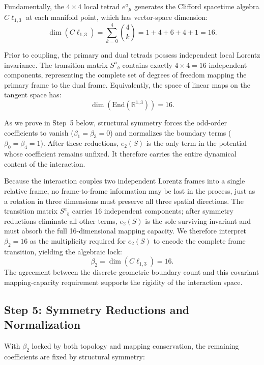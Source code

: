 \documentclass[twocolumn]{iopjournal}
\begin{document}
Fundamentally, the $4 \times 4$ local tetrad $e^a{}_\mu$ generates the Clifford spacetime algebra $C\ell_{1,3}$ at each manifold point, which has vector-space dimension:
\begin{equation}
\dim(C\ell_{1,3}) = \sum_{k=0}^{4} \binom{4}{k} = 1 + 4 + 6 + 4 + 1 = 16.
\end{equation}


Prior to coupling, the primary and dual tetrads possess independent local Lorentz invariance. The transition matrix $S^a{}_b$ contains exactly $4 \times 4 = 16$ independent components, representing the complete set of degrees of freedom mapping the primary frame to the dual frame. Equivalently, the space of linear maps on the tangent space has:
\begin{equation}
\dim(\mathrm{End}(\mathbb{R}^{1,3})) = 16.
\end{equation}

As we prove in Step~5 below, structural symmetry forces the odd-order coefficients to vanish ($\beta_1 = \beta_3 = 0$) and normalizes the boundary terms ($\beta_0 = \beta_4 = 1$). After these reductions, $e_2(S)$ is the only term in the potential whose coefficient remains unfixed. It therefore carries the entire dynamical content of the interaction.

Because the interaction couples two independent Lorentz frames into a single relative frame, no frame-to-frame information may be lost in the process, just as a rotation in three dimensions must preserve all three spatial directions. The transition matrix $S^a{}_b$ carries 16 independent components; after symmetry reductions eliminate all other terms, $e_2(S)$ is the sole surviving invariant and must absorb the full 16-dimensional mapping capacity. We therefore interpret $\beta_2 = 16$ as the multiplicity required for $e_2(S)$ to encode the complete frame transition, yielding the algebraic lock:
\begin{equation}
\beta_2 = \dim(C\ell_{1,3}) = 16.
\end{equation}
The agreement between the discrete geometric boundary count and this covariant mapping-capacity requirement supports the rigidity of the interaction space.

\subsection*{Step 5: Symmetry Reductions and Normalization}
With $\beta_2$ locked by both topology and mapping conservation, the remaining coefficients are fixed by structural symmetry:
\end{document}
